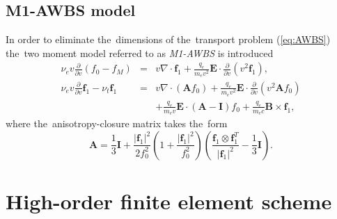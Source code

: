 \documentclass[review]{elsarticle}
\newcommand{\pdv}[2]{\frac{\partial{#1}}{\partial{#2}}}
\newcommand{\vect}[1]{\boldsymbol{#1}}
\newcommand{\matr}[1]{\mathbf{#1}}
\newcommand{\nue}{\nu_{e}}
\newcommand{\nutot}{\nu_{t}}
\newcommand{\vmag}{v}
\newcommand{\E}{\vect{E}}
\newcommand{\B}{\vect{B}}
\newcommand{\qe}{q_e}
\newcommand{\me}{m_e}
\newcommand{\fM}{f_M}
\newcommand{\fzero}{f_0}
\newcommand{\fone}{\vect{f}_1}
\newcommand{\MI}{\matr{I}}
\newcommand{\MA}{\matr{A}}
\renewcommand{\refeq}[1]{(\ref{#1})}
\begin{document}
\subsection{M1-AWBS model}
In order to eliminate the~dimensions of the~transport problem \refeq{eq:AWBS}
the~two moment model referred to as \textit{M1-AWBS} is introduced
\begin{eqnarray}
  \nue\vmag\pdv{}{\vmag}\left(\fzero - \fM \right) &=&
  \vmag\nabla\cdot\fone + \frac{\qe}{\me\vmag^2}\E\cdot\pdv{}{\vmag}
  \left( \vmag^2 \fone\right) , 
  \label{eq:M1f0}\\
  \nue\vmag\pdv{}{\vmag}\fone - \nutot\fone &=& 
  \vmag\nabla\cdot\left(\MA\fzero\right) + 
  \frac{\qe}{\me\vmag^2}\E\cdot\pdv{}{\vmag}
  \left( \vmag^2 \MA\fzero\right) \nonumber\\
  && + \frac{\qe}{\me\vmag}\E\cdot\left( \MA - \MI \right)\fzero +
  \frac{\qe}{\me c}\B\times\fone ,
  \label{eq:M1f1}
\end{eqnarray}
where the~anisotropy-closure matrix takes the~form
\begin{equation}
  \MA = \frac{1}{3}\MI + \frac{|\fone|^2}{2\fzero^2}
  \left( 1 + \frac{|\fone|^2}{\fzero^2} \right)
  \left( \frac{\fone\otimes\fone^T}{|\fone|^2} - \frac{1}{3}\MI\right) .
\end{equation}
\section{High-order finite element scheme}\label{sec:hos}

\end{document}
